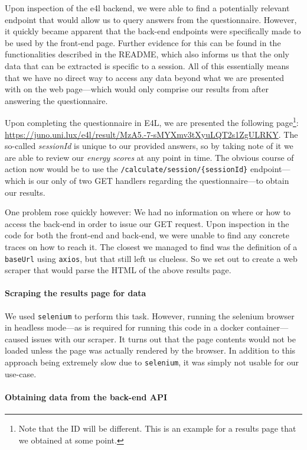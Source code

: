 Upon inspection of the \gls{e4l} backend, we were able to find a
potentially relevant endpoint that would allow us to query answers
from the questionnaire.  However, it quickly became apparent that the
back-end endpoints were specifically made to be used by the front-end
page. Further evidence for this can be found in the functionalities
described in the README, which also informs us that the only data that
can be extracted is specific to a session. All of this essentially
means that we have no direct way to access any data beyond what we are
presented with on the web page---which would only comprise our results
from after answering the questionnaire.

Upon completing the questionnaire in E4L, we are presented the
following page\footnote{Note that the ID will be different. This is an
example for a results page that we obtained at some point.}:
\url{https://juno.uni.lux/e4l/result/MzA5.-7-sMYXmv3tXyuLQT2s1ZgULRKY}.
The so-called	\textit{sessionId} is unique to our provided answers, so
by taking note of it we are able to review our \textit{energy scores}
at any point in time. The obvious course of action now would be to use
the \verb|/calculate/session/{sessionId}| endpoint---which is our only
of two GET handlers regarding the questionnaire---to obtain our
results.

One problem rose quickly however: We had no information on where or
how to access the back-end in order to issue our GET request. Upon
inspection in the code for both the front-end and back-end, we were
unable to find any concrete traces on how to reach it. The closest we
managed to find was the definition of a \verb|baseUrl| using \verb|axios|,
but that still left us clueless. So we set out to create a web scraper
that would parse the HTML of the above results page.

\paragraph{Scraping the results page for data}

We used \verb|selenium| to perform this task. However, running the
selenium browser in headless mode---as is required for running this
code in a docker container---caused issues with our scraper. It turns
out that the page contents would not be loaded unless the page was
actually rendered by the browser. In addition to this approach being
extremely slow due to \verb|selenium|, it was simply not usable for
our use-case.

\paragraph{Obtaining data from the back-end API}

